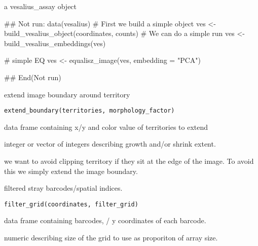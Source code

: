 \documentclass[a4paper]{book}
\begin{document}
%
\begin{Value}
a vesalius\_assay object
\end{Value}
%
\begin{Examples}
\begin{ExampleCode}
## Not run: 
data(vesalius)
# First we build a simple object
ves <- build_vesalius_object(coordinates, counts)
# We can do a simple run
ves <- build_vesalius_embeddings(ves)

# simple EQ
ves <- equalisz_image(ves, embedding = "PCA")

## End(Not run)
\end{ExampleCode}
\end{Examples}
%
\begin{Description}
extend image boundary around territory
\end{Description}
%
\begin{Usage}
\begin{verbatim}
extend_boundary(territories, morphology_factor)
\end{verbatim}
\end{Usage}
%
\begin{Arguments}
\begin{ldescription}
\item[\code{territories}] data frame containing x/y and color value of
territories to extend

\item[\code{morphology\_factor}] integer or vector of integers describing growth
and/or shrink extent.
\end{ldescription}
\end{Arguments}
%
\begin{Details}
we want to avoid clipping territory if they sit at the edge of the
image. To avoid this we simply extend the image boundary.
\end{Details}
%
\begin{Description}
filtered stray barcodes/spatial indices.
\end{Description}
%
\begin{Usage}
\begin{verbatim}
filter_grid(coordinates, filter_grid)
\end{verbatim}
\end{Usage}
%
\begin{Arguments}
\begin{ldescription}
\item[\code{coordinates}] data frame containing barcodes, / y coordinates of 
each barcode.

\item[\code{filter\_grid}] numeric describing size of the grid to use as proporiton 
of array size.
\end{ldescription}
\end{Arguments}
\end{document}
